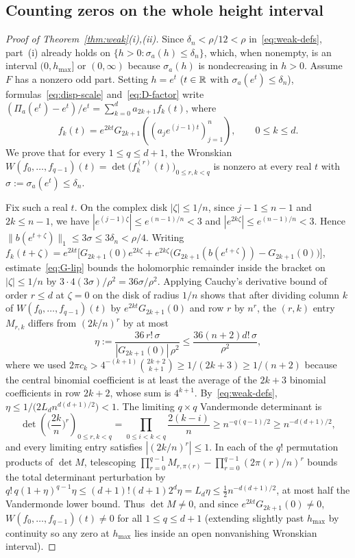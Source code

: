 \subsection{Counting zeros on the whole height interval}\label{subsec:weak-wronskian}

\begin{proof}[Proof of Theorem~\ref{thm:weak}\textup{(i),(ii)}]
Since $\delta_n<\rho/12<\rho$ in~\eqref{eq:weak-defs}, part~(i) already holds on $\{h>0:\sigma_a(h)\le\delta_n\}$, which, when nonempty, is an interval $(0,h_{\max}]$ or $(0,\infty)$ because $\sigma_a(h)$ is nondecreasing in $h>0$. Assume $F$ has a nonzero odd part. Setting $h=e^t$ ($t\in\mathbb{R}$ with $\sigma_a(e^t)\le\delta_n$), formulas~\eqref{eq:disp-scale} and~\eqref{eq:D-factor} write $(\Pi_a(e^t)-e^t)/e^t=\sum_{k=0}^d a_{2k+1} f_k(t)$, where
\[
  f_k(t) = e^{2kt} G_{2k+1}\!\left((a_j e^{(j-1)t})_{j=1}^n\right),\qquad 0\le k\le d.
\]
We prove that for every $1\le q\le d+1$, the Wronskian $W(f_0,\dots,f_{q-1})(t)=\det\big(f_k^{(r)}(t)\big)_{0\le r,k<q}$ is nonzero at every real $t$ with $\sigma:=\sigma_a(e^t)\le\delta_n$.

Fix such a real $t$. On the complex disk $|\zeta|\le 1/n$, since $j-1\le n-1$ and $2k\le n-1$, we have $|e^{(j-1)\zeta}|\le e^{(n-1)/n}<3$ and $|e^{2k\zeta}|\le e^{(n-1)/n}<3$. Hence $\|b(e^{t+\zeta})\|_1\le 3\sigma\le 3\delta_n<\rho/4$. Writing $f_k(t+\zeta)=e^{2kt}\big[G_{2k+1}(0)e^{2k\zeta}+e^{2k\zeta}\big(G_{2k+1}(b(e^{t+\zeta}))-G_{2k+1}(0)\big)\big]$, estimate~\eqref{eq:G-lip} bounds the holomorphic remainder inside the bracket on $|\zeta|\le 1/n$ by $3\cdot 4(3\sigma)/\rho^2=36\sigma/\rho^2$. Applying Cauchy's derivative bound of order $r\le d$ at $\zeta=0$ on the disk of radius $1/n$ shows that after dividing column $k$ of $W(f_0,\dots,f_{q-1})(t)$ by $e^{2kt}G_{2k+1}(0)$ and row $r$ by $n^r$, the $(r,k)$ entry $M_{r,k}$ differs from $(2k/n)^r$ by at most
\[
  \eta := \frac{36\,r!\,\sigma}{|G_{2k+1}(0)|\,\rho^2} \le \frac{36(n+2)d!\,\sigma}{\rho^2},
\]
where we used $2\pi c_k>4^{-(k+1)}\binom{2k+2}{k+1}\ge 1/(2k+3)\ge 1/(n+2)$ because the central binomial coefficient is at least the average of the $2k+3$ binomial coefficients in row $2k+2$, whose sum is $4^{k+1}$. By~\eqref{eq:weak-defs}, $\eta\le 1/\big(2L_d n^{d(d+1)/2}\big)<1$. The limiting $q\times q$ Vandermonde determinant is
\[
  \det\!\left(\Big(\frac{2k}{n}\Big)^r\right)_{0\le r,k<q} = \prod_{0\le i<k<q}\frac{2(k-i)}{n} \ge n^{-q(q-1)/2} \ge n^{-d(d+1)/2},
\]
and every limiting entry satisfies $|(2k/n)^r|\le 1$. In each of the $q!$ permutation products of $\det M$, telescoping $\prod_{r=0}^{q-1} M_{r,\pi(r)} - \prod_{r=0}^{q-1}(2\pi(r)/n)^r$ bounds the total determinant perturbation by $q!\,q(1+\eta)^{q-1}\eta \le (d+1)!(d+1)2^d\eta = L_d\eta \le \tfrac12 n^{-d(d+1)/2}$, at most half the Vandermonde lower bound. Thus $\det M\neq 0$, and since $e^{2kt}G_{2k+1}(0)\neq 0$, $W(f_0,\dots,f_{q-1})(t)\neq 0$ for all $1\le q\le d+1$ (extending slightly past $h_{\max}$ by continuity so any zero at $h_{\max}$ lies inside an open nonvanishing Wronskian interval).


\end{proof}
